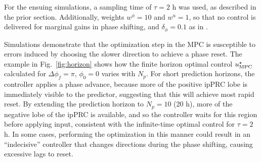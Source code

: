 For the ensuing simulations, a sampling time of $\tau = 2$ h was used, as described in the prior section.
Additionally, weights $w^\phi = 10$ and $w^u = 1$, so that no control is delivered for marginal gains in phase shifting, and $\delta_\phi=0.1$ as in \cite{Abel2017a}.

Simulations demonstrate that the optimization step in the MPC is susceptible to errors induced by choosing the slower direction to achieve a phase reset.
The example in Fig.~\ref{fig:horizon} shows how the finite horizon optimal control $u^\star_{\rm MPC}$ calculated for $\Delta\phi_f = \pi$, $\phi_0=0$ varies with $N_p$.
For short prediction horizons, the controller applies a phase advance, because more of the positive ipPRC lobe is immediately visible to the predictor, suggesting that this will achieve most rapid reset.
By extending the prediction horizon to $N_p = 10$ (20 h), more of the negative lobe of the ipPRC is available, and so the controller waits for this region before applying input, consistent with the infinite-time optimal control for $\tau = 2$ h.
In some cases, performing the optimization in this manner could result in an ``indecisive'' controller that changes directions during the phase shifting, causing excessive lags to reset.

